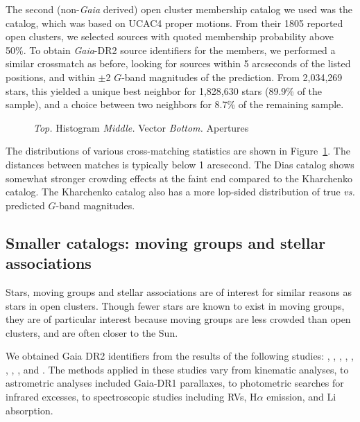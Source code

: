 \documentclass[12pt,twocolumn,tighten]{aastex62}
\begin{document}
The second (non-{\it Gaia} derived) open cluster membership catalog we
used was the \citet{dias_proper_2014} catalog, which was based on
UCAC4 proper motions.
From their 1805 reported open clusters, we selected sources with
quoted membership probability above 50\%.
To obtain {\it Gaia}-DR2 source identifiers for the members, we
performed a similar crossmatch as before, looking for sources within 5
arcseconds of the listed positions, and within $\pm$2 $G$-band
magnitudes of the prediction.
From 2{,}034{,}269 stars, this yielded a unique
best neighbor for 1{,}828{,}630 stars (89.9\% of the sample), and a choice
between two neighbors for 8.7\% of the remaining sample. 

\begin{figure}[!ht]
  \vspace{-0.8cm}
  \vspace{-0.8cm}
  \caption{
      {\it Top.} Histogram
      {\it Middle.} Vector
      {\it Bottom.} Apertures
  }
  \label{fig:xmatch_info}
\end{figure}

The distributions of various cross-matching statistics are shown in
Figure~\ref{fig:xmatch_info}.  The distances between matches is
typically below 1 arcsecond.  The Dias catalog shows somewhat stronger
crowding effects at the faint end compared to the Kharchenko catalog.
The Kharchenko catalog also has a more lop-sided distribution of true
{\it vs.} predicted $G$-band magnitudes.


\subsection{Smaller catalogs: moving groups and stellar associations}
\label{subsec:mg}

Stars, moving groups and stellar associations are of interest for
similar reasons as stars in open clusters.  Though fewer stars
are known to exist in moving groups, they are of particular interest
because moving groups are less crowded than open clusters, and are
often closer to the Sun.

We obtained Gaia DR2 identifiers from the results of the following
studies:
\citet{gagne_banyan_XI_2018},
\citet{gagne_banyan_XII_2018},
\citet{gagne_banyan_XIII_2018},
\citet{kraus_tucanahor_2014},
\citet{roser_deep_2011}, %
\citet{bell_32ori_2017},
\citet{rizzuto_multidimensional_2011},
\citet{oh_comoving_2017}, and
\citet{zari_3d_2018}. The methods applied in these studies
vary from kinematic analyses, to astrometric analyses included
Gaia-DR1 parallaxes, to photometric searches for infrared excesses, to
spectroscopic studies including RVs, H$\alpha$
emission, and Li absorption.
\end{document}
